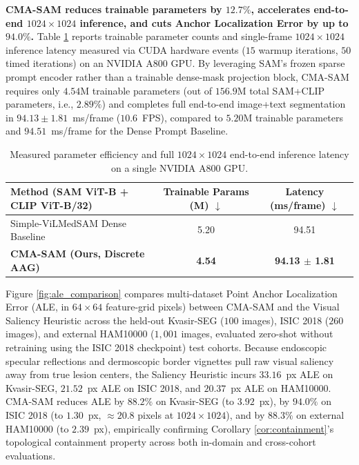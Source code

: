 \documentclass[onecolumn]{IEEEtran}
\numberwithin{equation}{section}
\theoremstyle{definition}
\theoremstyle{remark}
\begin{document}
\textbf{CMA-SAM reduces trainable parameters by $12.7\%$, accelerates end-to-end $1024 \times 1024$ inference, and cuts Anchor Localization Error by up to $94.0\%$.} Table \ref{tab:efficiency} reports trainable parameter counts and single-frame $1024 \times 1024$ inference latency measured via CUDA hardware events ($15$ warmup iterations, $50$ timed iterations) on an NVIDIA A800 GPU. By leveraging SAM's frozen sparse prompt encoder rather than a trainable dense-mask projection block, CMA-SAM requires only $4.54\text{M}$ trainable parameters (out of $156.9\text{M}$ total SAM+CLIP parameters, i.e., $2.89\%$) and completes full end-to-end image+text segmentation in $94.13 \pm 1.81$~ms/frame ($10.6$~FPS), compared to $5.20\text{M}$ trainable parameters and $94.51$~ms/frame for the Dense Prompt Baseline.

\begin{table}[!htbp]
\centering
\caption{Measured parameter efficiency and full $1024 \times 1024$ end-to-end inference latency on a single NVIDIA A800 GPU.}
\label{tab:efficiency}
\begin{tabularx}{\linewidth}{@{}Xcc@{}}
\toprule
\textbf{Method (SAM ViT-B + CLIP ViT-B/32)} & \textbf{Trainable Params (M)} $\downarrow$ & \textbf{Latency (ms/frame)} $\downarrow$ \\
\midrule
Simple-ViLMedSAM Dense Baseline \cite{qian2024simplevilmedsam} & 5.20 & 94.51 \\
\textbf{CMA-SAM (Ours, Discrete AAG)} & \textbf{4.54} & \textbf{94.13 $\pm$ 1.81} \\
\bottomrule
\end{tabularx}
\end{table}

Figure \ref{fig:ale_comparison} compares multi-dataset Point Anchor Localization Error (ALE, in $64 \times 64$ feature-grid pixels) between CMA-SAM and the Visual Saliency Heuristic \cite{xie2025self} across the held-out Kvasir-SEG ($100$ images), ISIC 2018 ($260$ images), and external HAM10000 ($1{,}001$ images, evaluated zero-shot without retraining using the ISIC 2018 checkpoint) test cohorts. Because endoscopic specular reflections and dermoscopic border vignettes pull raw visual saliency away from true lesion centers, the Saliency Heuristic incurs $33.16$~px ALE on Kvasir-SEG, $21.52$~px ALE on ISIC 2018, and $20.37$~px ALE on HAM10000. CMA-SAM reduces ALE by $88.2\%$ on Kvasir-SEG (to $3.92$~px), by $94.0\%$ on ISIC 2018 (to $1.30$~px, $\approx 20.8$ pixels at $1024 \times 1024$), and by $88.3\%$ on external HAM10000 (to $2.39$~px), empirically confirming Corollary \ref{cor:containment}'s topological containment property across both in-domain and cross-cohort evaluations.
\end{document}
